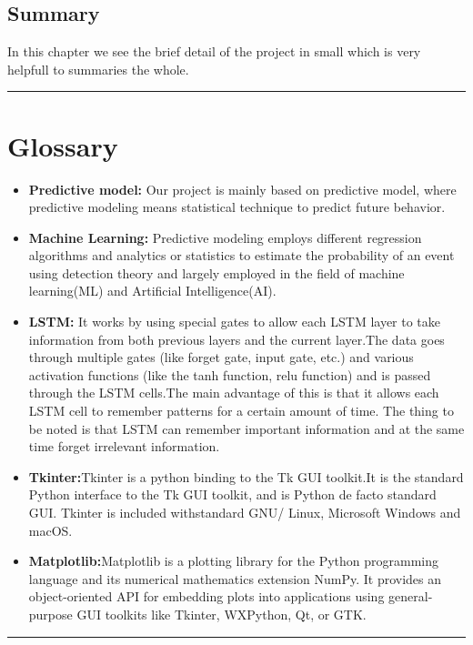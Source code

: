 \documentclass[openany,12pt]{report}
\begin{document}
{{{{{ \section{Summary}
In this chapter we see the brief detail of the project in small which is very helpfull to summaries the whole.
\vfill
\hrule
\appendix
\cleardoublepage
{}

\chapter{Glossary}
\begin{itemize}
\item{\textbf{Predictive model:}} Our project is mainly based on predictive model, where predictive modeling means statistical technique to predict future behavior.
\item{\textbf{Machine Learning:}} Predictive modeling employs different regression algorithms and analytics or statistics to estimate the probability of an event using detection theory and largely employed in the field of machine learning(ML) and Artificial Intelligence(AI). 
\item{\textbf {LSTM:}} It works by using special gates to allow each LSTM layer to take information from both previous layers and the current layer.The data goes through multiple gates (like forget gate, input gate, etc.) and various activation functions (like the tanh function, relu function) and is passed through the LSTM cells.The main advantage of this is that it allows each LSTM cell to remember patterns for a certain amount of time. The thing to be noted is that LSTM can remember important information and at
the same time forget irrelevant information.

\item{\textbf {Tkinter:}}Tkinter is a python binding to the Tk GUI toolkit.It is the standard Python interface to the Tk GUI toolkit, and is Python de facto standard GUI. Tkinter is included withstandard GNU/ Linux, Microsoft Windows and macOS. 
\item{\textbf {Matplotlib:}}Matplotlib is a plotting library for the Python programming language and its numerical mathematics extension NumPy. It provides an object-oriented API for embedding plots into applications using general-purpose GUI toolkits like Tkinter, WXPython, Qt, or GTK.

\end{itemize}
\vfill
\hrule


}}}}}
\end{document}

